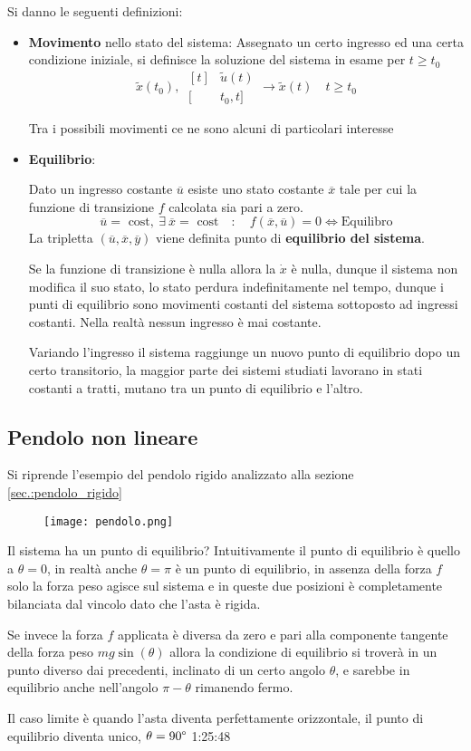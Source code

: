 Si danno le seguenti definizioni:
\begin{itemize}
\item \textbf{Movimento} nello stato del sistema: Assegnato un certo ingresso
ed una certa condizione iniziale, si definisce la soluzione del sistema in
esame per $t\geq t_0$
$$
\tilde{x}(t_0) ,\ \begin{aligned}[t]&\tilde{u}(t)\\ [&t_0, t]\end{aligned}
\longrightarrow \tilde x(t)\quad t\geq t_0
$$


Tra i possibili movimenti ce ne sono alcuni di particolari interesse

\item \textbf{Equilibrio}:

Dato un ingresso costante $\overline{u}$ esiste uno stato costante
$\overline{x}$ tale per cui la funzione di transizione $f$ calcolata sia pari a
zero.
$$
\overline{u} = \text{ cost} ,\ \exists\  \overline{x} = \text{ cost} \quad :
\quad f(\overline{x},\overline{u})=0 \Leftrightarrow \text{Equilibro}
$$
La tripletta $(\overline{u},\overline{x},\overline{y})$ viene definita punto di
\textbf{equilibrio del sistema}.

Se la funzione di transizione è nulla allora la $\dot x$ è nulla, dunque il
sistema non modifica il suo stato, lo stato perdura indefinitamente nel tempo,
dunque i punti di equilibrio sono movimenti costanti del sistema sottoposto ad
ingressi costanti.
Nella realtà nessun ingresso è mai costante.

Variando l'ingresso il sistema raggiunge un nuovo punto di equilibrio dopo un
certo transitorio, la maggior parte dei sistemi studiati lavorano in stati
costanti a tratti, mutano tra un punto di equilibrio e l'altro.
\end{itemize}

\subsection{Pendolo non lineare}
Si riprende l'esempio del pendolo rigido analizzato alla sezione
\ref{sec.:pendolo_rigido}
\begin{figure}[h]
 \centering
 \texttt{[image: pendolo.png]}
 \label{Fig.:pendolo_semplice}
\end{figure}
Il sistema ha un punto di equilibrio?
Intuitivamente il punto di equilibrio è quello a $\theta=0$, in realtà anche
$\theta=\pi$ è un punto di equilibrio, in assenza della forza $f$ solo la forza
peso agisce sul sistema e in queste due posizioni è completamente bilanciata
dal vincolo dato che l'asta è rigida.

Se invece la forza $f$ applicata è diversa da zero e pari alla componente
tangente della forza peso $mg\sin(\theta)$ allora la condizione di equilibrio
si troverà in un punto diverso dai precedenti, inclinato di un certo angolo
$\theta$, e sarebbe in equilibrio anche nell'angolo $\pi - \theta$ rimanendo
fermo.

Il caso limite è quando l'asta diventa perfettamente orizzontale, il punto di
equilibrio diventa unico, $\theta = 90\text{\textdegree}$
1:25:48
